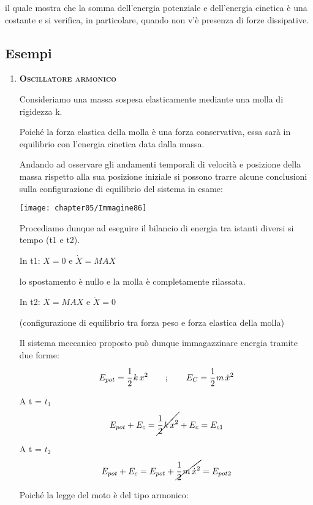 	il quale mostra che la somma dell'energia potenziale e dell'energia cinetica è una costante e si verifica, in particolare, quando non v'è presenza di forze dissipative.
	
	\subsection{Esempi}
	\begin{enumerate}
	\item {\scshape{\bfseries Oscillatore armonico}}
	
	
	\begin{minipage}{.7\textwidth}
Consideriamo una massa sospesa elasticamente mediante una molla di rigidezza k.

 Poiché la forza elastica della molla è una forza conservativa, essa sarà in equilibrio con l'energia cinetica data dalla massa.
 
 Andando ad osservare gli andamenti temporali di velocità e posizione della massa rispetto alla sua posizione iniziale si possono trarre alcune conclusioni sulla configurazione di equilibrio del sistema in esame:
	\end{minipage}
	\hfill
	\begin{minipage}{.25\textwidth}
		\centering
		\texttt{[image: chapter05/Immagine86]}
	\end{minipage}
	
	
	Procediamo dunque ad eseguire il bilancio di energia tra istanti diversi si tempo (t1 e t2).
	
	In t1: $X = 0$ e $\dot{X} = MAX$
	
	 lo spostamento è nullo e la molla è completamente rilassata.
	 
	 In t2: $X = MAX$ e $\dot{X} = 0$
	 
	  (configurazione di equilibrio tra forza peso e forza elastica della molla)	
	
	Il sistema meccanico proposto può dunque immagazzinare energia tramite due forme:
	\begin{gather*}
	 E_{pot} = \cfrac{1}{2}\,k\,x^2\qquad;\qquad E_C = \cfrac{1}{2}\,m\,\dot{x}^2
	\end{gather*}
	
	A t = $t_1$ \[E_{pot}+E_c = \cancel{\cfrac{1}{2}\,k\,x^2} + E_c = E_{c1} \]
	
	A t = $t_2$ \[E_{pot}+E_c = E_{pot} + \cancel{ \cfrac{1}{2}\,m\,\dot{x}^2} = E_{pot2}\]
	
	Poiché la legge del moto è del tipo armonico:
	

\end{enumerate}
